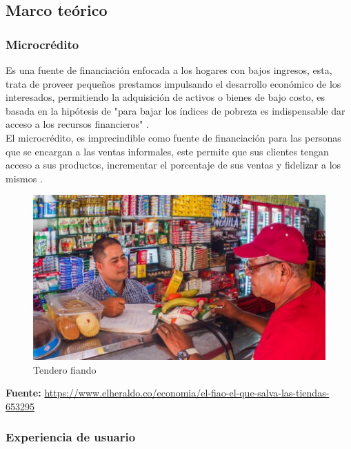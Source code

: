 	
	\subsection{Marco teórico}
	
		\subsubsection{Microcrédito}
		
		{Es una fuente de financiación enfocada a los hogares con bajos ingresos, esta, trata de proveer pequeños prestamos impulsando el desarrollo económico de los interesados, permitiendo la adquisición de activos o bienes de bajo costo, es basada en la hipótesis de "para bajar los índices de pobreza es indispensable dar acceso a los recursos financieros" \cite{MaricruzMicro,BarbaraMicro}.\\
		
		El microcrédito, es imprecindible como fuente de financiación para las personas que se encargan a las ventas informales, este permite que sus clientes tengan acceso a sus productos, incrementar el porcentaje de sus ventas y fidelizar a los mismos \cite{LupeTrust}.\\
	
		\begin{figure}[H]
			\centering
			\includegraphics[width=0.8\linewidth]{description/framework/tendero.jpg}
			\caption{Tendero fiando}
		\end{figure}
	
		\begin{center}
			\textbf{Fuente:} \url{https://www.elheraldo.co/economia/el-fiao-el-que-salva-las-tiendas-653295}
		\end{center}
		}
	
	
		\subsubsection{Experiencia de usuario}
		
